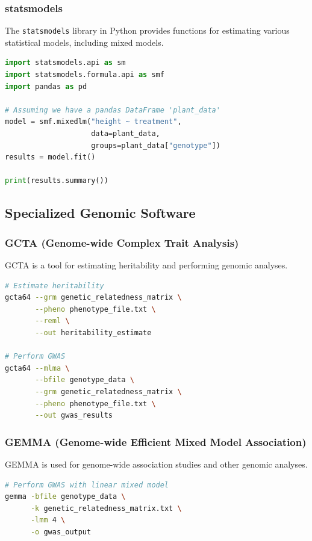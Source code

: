 \documentclass[12pt,a4paper]{article}
\begin{document}
\subsubsection{statsmodels}

The \texttt{statsmodels} library in Python provides functions for estimating various statistical models, including mixed models.

\begin{lstlisting}[language=Python]
import statsmodels.api as sm
import statsmodels.formula.api as smf
import pandas as pd

# Assuming we have a pandas DataFrame 'plant_data'
model = smf.mixedlm("height ~ treatment", 
                    data=plant_data, 
                    groups=plant_data["genotype"])
results = model.fit()

print(results.summary())
\end{lstlisting}

\subsection{Specialized Genomic Software}

\subsubsection{GCTA (Genome-wide Complex Trait Analysis)}

GCTA is a tool for estimating heritability and performing genomic analyses.

\begin{lstlisting}[language=bash]
# Estimate heritability
gcta64 --grm genetic_relatedness_matrix \
       --pheno phenotype_file.txt \
       --reml \
       --out heritability_estimate

# Perform GWAS
gcta64 --mlma \
       --bfile genotype_data \
       --grm genetic_relatedness_matrix \
       --pheno phenotype_file.txt \
       --out gwas_results
\end{lstlisting}

\subsubsection{GEMMA (Genome-wide Efficient Mixed Model Association)}

GEMMA is used for genome-wide association studies and other genomic analyses.

\begin{lstlisting}[language=bash]
# Perform GWAS with linear mixed model
gemma -bfile genotype_data \
      -k genetic_relatedness_matrix.txt \
      -lmm 4 \
      -o gwas_output
\end{lstlisting}
\end{document}
